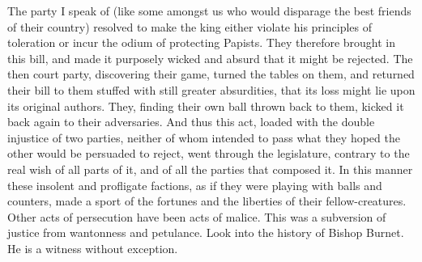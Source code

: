 The party I speak of (like some amongst us who would disparage the best friends of their country) resolved to make the king either violate his principles of toleration or incur the odium of protecting Papists. They therefore brought in this bill, and made it purposely wicked and absurd that it might be rejected. The then court party, discovering their game, turned the tables on them, and returned their bill to them stuffed with still greater absurdities, that its loss might lie upon its original authors. They, finding their own ball thrown back to them, kicked it back again to their adversaries. And thus this act, loaded with the double injustice of two parties, neither of whom intended to pass what they hoped the other would be persuaded to reject, went through the legislature, contrary to the real wish of all parts of it, and of all the parties that composed it. In this manner these insolent and profligate factions, as if they were playing with balls and counters, made a sport of the fortunes and the liberties of their fellow-creatures. Other acts of persecution have been acts of malice. This was a subversion of justice from wantonness and petulance. Look into the history of Bishop Burnet. He is a witness without exception.

